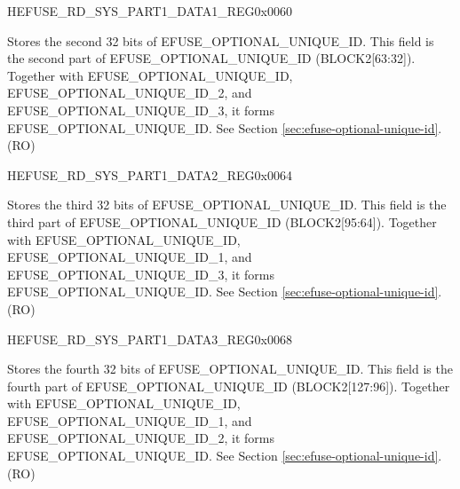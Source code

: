 \begin{register}{H}{EFUSE\_RD\_SYS\_PART1\_DATA1\_REG}{0x0060}\label{regdesc:EFUSERDSYSPART1DATA1REG}
%
\regnewline%
\begin{regdesc}\begin{reglist}
\label{fielddesc:EFUSEOPTIONALUNIQUEID1}\item [EFUSE\_OPTIONAL\_UNIQUE\_ID\_1] Stores the second 32 bits of EFUSE\_OPTIONAL\_UNIQUE\_ID. This field is the second part of EFUSE\_OPTIONAL\_UNIQUE\_ID (BLOCK2[63:32]). Together with EFUSE\_OPTIONAL\_UNIQUE\_ID, EFUSE\_OPTIONAL\_UNIQUE\_ID\_2, and EFUSE\_OPTIONAL\_UNIQUE\_ID\_3, it forms EFUSE\_OPTIONAL\_UNIQUE\_ID. See Section \ref{sec:efuse-optional-unique-id}. (RO)
\end{reglist}\end{regdesc}
\end{register}


\begin{register}{H}{EFUSE\_RD\_SYS\_PART1\_DATA2\_REG}{0x0064}\label{regdesc:EFUSERDSYSPART1DATA2REG}
%
\regnewline%
\begin{regdesc}\begin{reglist}
\label{fielddesc:EFUSEOPTIONALUNIQUEID2}\item [EFUSE\_OPTIONAL\_UNIQUE\_ID\_2] Stores the third 32 bits of EFUSE\_OPTIONAL\_UNIQUE\_ID. This field is the third part of EFUSE\_OPTIONAL\_UNIQUE\_ID (BLOCK2[95:64]). Together with EFUSE\_OPTIONAL\_UNIQUE\_ID, EFUSE\_OPTIONAL\_UNIQUE\_ID\_1, and EFUSE\_OPTIONAL\_UNIQUE\_ID\_3, it forms EFUSE\_OPTIONAL\_UNIQUE\_ID. See Section \ref{sec:efuse-optional-unique-id}. (RO)
\end{reglist}\end{regdesc}
\end{register}


\begin{register}{H}{EFUSE\_RD\_SYS\_PART1\_DATA3\_REG}{0x0068}\label{regdesc:EFUSERDSYSPART1DATA3REG}
%
\regnewline%
\begin{regdesc}\begin{reglist}
\label{fielddesc:EFUSEOPTIONALUNIQUEID3}\item [EFUSE\_OPTIONAL\_UNIQUE\_ID\_3] Stores the fourth 32 bits of EFUSE\_OPTIONAL\_UNIQUE\_ID. This field is the fourth part of EFUSE\_OPTIONAL\_UNIQUE\_ID (BLOCK2[127:96]). Together with EFUSE\_OPTIONAL\_UNIQUE\_ID, EFUSE\_OPTIONAL\_UNIQUE\_ID\_1, and EFUSE\_OPTIONAL\_UNIQUE\_ID\_2, it forms EFUSE\_OPTIONAL\_UNIQUE\_ID. See Section \ref{sec:efuse-optional-unique-id}. (RO)
\end{reglist}\end{regdesc}
\end{register}



